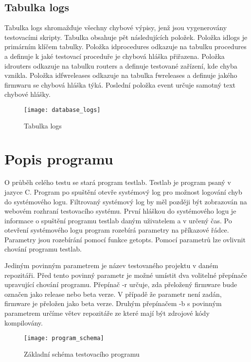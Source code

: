 \subsection{Tabulka logs}
Tabulka logs shromažďuje všechny chybové výpisy, jenž jsou vygenerovány testovacími skripty. Tabulka obsahuje pět následujících položek. Položka idlogs je primárním klíčem tabulky. Položka idprocedures odkazuje na tabulku procedures a definuje k jaké testovací proceduře je chybová hláška přiřazena. Položka idrouters odkazuje na tabulku routers a definuje testované zařízení, kde chyba vznikla. Položka idfwreleases odkazuje na tabulka fwreleases a definuje jakého firmwaru se chybová hláška týká. Poslední položka event určuje samotný text chybové hlášky.

\begin{figure}[h]
  \centering
  \texttt{[image: database\_logs]}
  \caption{Tabulka logs}
  \label{fig:database_logs}
\end{figure}

\section{Popis programu}

O průběh celého testu se stará program testlab. Testlab je program psaný v jazyce C. Program po spuštění otevře systémový log pro možnost logování chyb do systémového logu. Filtrovaný systémový log by měl později být zobrazován na webovém rozhraní testovacího systému. První hláškou do systémového logu je informace o spuštění programu testlab daným uživatelem a v určený čas. Po otevření systémového logu program rozebírá parametry na příkazové řádce. Parametry jsou rozebírání pomocí funkce getopts. Pomocí parametrů lze ovlivnit chování programu testlab.

Jediným povinným parametrem je název testovaného projektu v daném repozitáři. Před tento povinný parametr je možné umístit dva volitelné přepínače upravující chování programu. Přepínač -r určuje, zda přeložený firmware bude označen jako release nebo beta verze. V případě že parametr není zadán, firmware je přeložen jako beta verze. Druhým přepínačem -b s povinným parametrem určíme větev repozitáře ze které mají být zdrojové kódy kompilovány.

\begin{figure}[h]
  \centering
  \texttt{[image: program\_schema]}
  \caption{Základní schéma testovacího programu}
  \label{fig:program_schema}
\end{figure}

